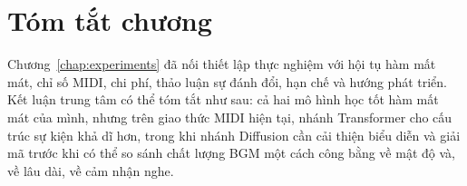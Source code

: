 \section*{Tóm tắt chương}

Chương~\ref{chap:experiments} đã nối thiết lập thực nghiệm với hội tụ hàm mất mát, chỉ số MIDI, chi phí, thảo luận sự đánh đổi, hạn chế và hướng phát triển. Kết luận trung tâm có thể tóm tắt như sau: cả hai mô hình học tốt hàm mất mát của mình, nhưng trên giao thức MIDI hiện tại, nhánh Transformer cho cấu trúc sự kiện khả dĩ hơn, trong khi nhánh Diffusion cần cải thiện biểu diễn và giải mã trước khi có thể so sánh chất lượng BGM một cách công bằng về mật độ và, về lâu dài, về cảm nhận nghe.
